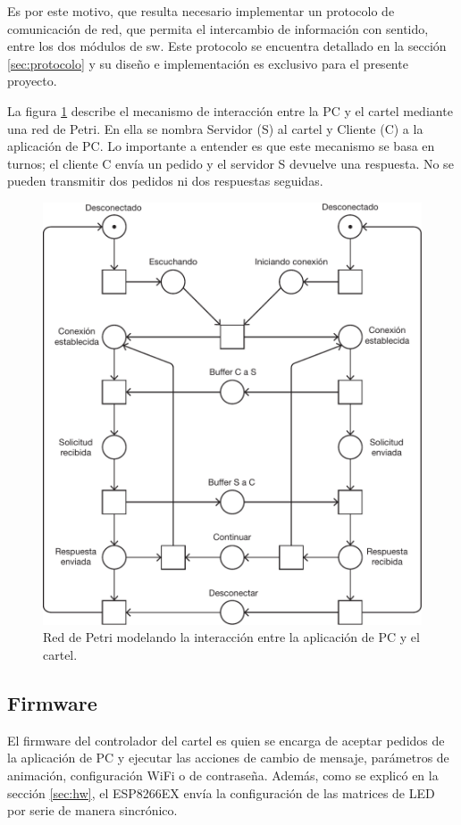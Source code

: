 Es por este motivo, que resulta necesario implementar un protocolo de comunicación de red, que permita el intercambio de información con sentido, entre los dos módulos de sw.
Este protocolo se encuentra detallado en la sección \ref{sec:protocolo} y su diseño e implementación es exclusivo para el presente proyecto.

La figura \ref{fig:petri-net} describe el mecanismo de interacción entre la PC y el cartel mediante una red de Petri. En ella se nombra Servidor (S) al cartel y Cliente (C) a la aplicación de PC. Lo importante a entender es que este mecanismo se basa en turnos; el cliente C envía un pedido y el servidor S devuelve una respuesta. No se pueden transmitir dos pedidos ni dos respuestas seguidas.

\begin{figure}[ht!]
	\centering
	\includegraphics[width=1\linewidth]{imagenes/petri-net.pdf}
	\caption{Red de Petri modelando la interacción entre la aplicación de PC y el cartel.}
	\label{fig:petri-net}
\end{figure}


\subsection{Firmware}
El firmware del controlador del cartel es quien se encarga de aceptar pedidos de la aplicación de PC y ejecutar las acciones de cambio de mensaje, parámetros de animación, configuración WiFi o de contraseña. Además, como se explicó en la sección \ref{sec:hw}, el ESP8266EX envía la configuración de las matrices de LED por serie de manera sincrónico.




